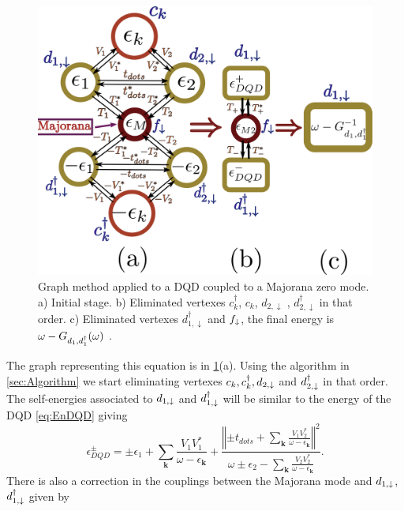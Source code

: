  
     \begin{figure}[bt]
    \centering
    \includegraphics[scale=0.4]{IMAGES/Graphs/FinalGraph.png}
    \caption{\label{fig:Graph-MDQD} Graph method applied to a DQD coupled to a Majorana zero mode. a) Initial stage. b) Eliminated vertexes $c^\dagger_k$, $c_k$, $d_{2, \downarrow}$ , $d^\dagger_{2, \downarrow}$ in that order. c) Eliminated vertexes $d^\dagger_{1, \downarrow}$ and $f_\downarrow$, the final energy is $\omega-G_{d_1,d_1^\dagger}(\omega)$  . \protect\Source{   }} 
    \end{figure}

 The graph representing this equation is in  \ref{fig:Graph-MDQD}(a). Using the algorithm in \ref{sec:Algorithm} we start eliminating vertexes $c_k,c^\dagger_k, d_{2,\downarrow}$ and $ d^\dagger_{2,\downarrow}$ in that order. The self-energies associated to $d_{1,\downarrow}$ and $d^\dagger_{1,\downarrow}$ will be similar to the energy of the DQD \eqref{eq:EnDQD} giving 
\begin{equation}
    \epsilon_{DQD}^{\pm}=\pm\epsilon_{1}+\sum_{\mathbf{k}}\frac{V_{1}V_{1}^{*}}{\omega-\epsilon_{\mathbf{k}}}+\frac{\left\Vert \pm t_{dots}+\sum_{\mathbf{k}}\frac{V_{1}V_{2}^{*}}{\omega-\epsilon_{\mathbf{k}}}\right\Vert ^{2}}{\omega\pm\epsilon_{2}-\sum_{\mathbf{k}}\frac{V_{2}V_{2}^{*}}{\omega-\epsilon_{\mathbf{k}}}}. \label{eq:epDQD}
\end{equation}
\noindent There is also a correction in the couplings between the Majorana mode and $d_{1,\downarrow}$, $d^\dagger_{1,\downarrow}$ given by 


